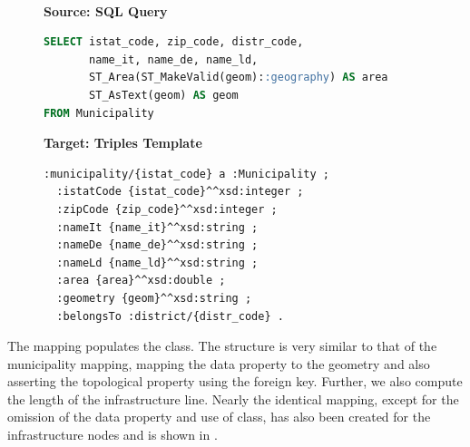 \begin{figure}[ht!]
  \vspace*{-1mm}
  \textbf{\small{}} \\
  \begin{minipage}[t]{0.50\textwidth}
    \centering
    \textbf{\scriptsize Source: SQL Query}
\begin{lstlisting}[language=SQL]
SELECT istat_code, zip_code, distr_code,
       name_it, name_de, name_ld,
       ST_Area(ST_MakeValid(geom)::geography) AS area
       ST_AsText(geom) AS geom
FROM Municipality
\end{lstlisting}
  \end{minipage}
  \hfill
  \begin{minipage}[t]{0.50\textwidth}
    \centering
    \textbf{\scriptsize Target: Triples Template}
\begin{lstlisting}[language=Turtle]
:municipality/{istat_code} a :Municipality ;
  :istatCode {istat_code}^^xsd:integer ;
  :zipCode {zip_code}^^xsd:integer ;
  :nameIt {name_it}^^xsd:string ;
  :nameDe {name_de}^^xsd:string ;
  :nameLd {name_ld}^^xsd:string ;
  :area {area}^^xsd:double ;
  :geometry {geom}^^xsd:string ;
  :belongsTo :district/{distr_code} . 
\end{lstlisting}
  \end{minipage}
  \vspace*{-4mm}
\end{figure}

The mapping  populates the  class. The structure is very similar to that of the municipality mapping, mapping the  data property to the geometry and also asserting the topological  property using the  foreign key. Further, we also compute the length of the infrastructure line. Nearly the identical mapping, except for the omission of the  data property and use of  class, has also been created for the infrastructure nodes and is shown in .


